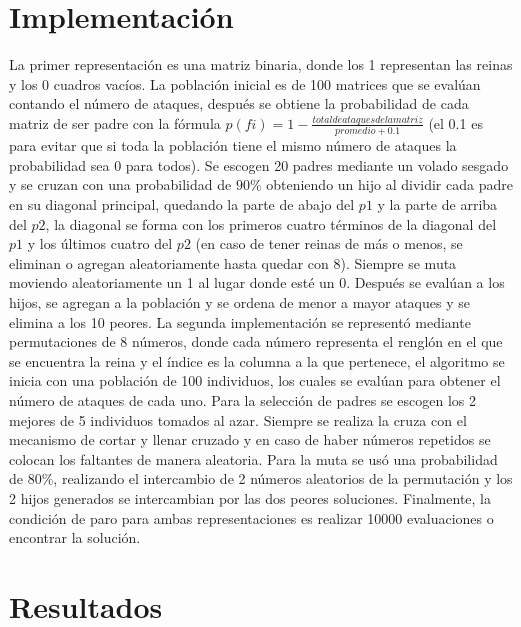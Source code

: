 \documentclass[runningheads]{llncs}
\begin{document}
\section{Implementación}
La primer representación es una matriz binaria, donde los 1 representan las reinas y los 0 cuadros vacíos. La población inicial es de 100 matrices que se evalúan contando el número de ataques, después se obtiene la probabilidad de cada matriz de ser padre con la fórmula $p(fi)=1- \frac{total de ataques de la matriz}{promedio+0.1}$ (el 0.1 es para evitar que si toda la población tiene el mismo número de ataques la probabilidad sea 0 para todos). Se escogen 20 padres mediante un volado sesgado y se cruzan con una probabilidad de $90\%$ obteniendo un hijo al dividir cada padre en su diagonal principal, quedando la parte de abajo del $p1$ y la parte de arriba del $p2$, la diagonal se forma con los primeros cuatro términos de la diagonal del $p1$ y los últimos cuatro del $p2$ (en caso de tener reinas de más o menos, se eliminan o agregan aleatoriamente hasta quedar con 8). Siempre se muta moviendo aleatoriamente un 1 al lugar donde esté un 0. Después se evalúan a los hijos, se agregan a la población y se ordena de menor a mayor ataques y se elimina a los 10 peores. La segunda implementación se representó mediante permutaciones de 8 números, donde cada número representa el renglón en el que se encuentra la reina y el índice es la columna a la que pertenece, el algoritmo se inicia con una población de 100 individuos, los cuales se evalúan para obtener el número de ataques de cada uno. Para la selección de padres se escogen los 2 mejores de 5 individuos tomados al azar. Siempre se realiza la cruza con el mecanismo de cortar y llenar cruzado y en caso de haber números repetidos se colocan los faltantes de manera aleatoria. Para la muta se usó una probabilidad de $80\%$, realizando el intercambio de 2 números aleatorios de la permutación y los 2 hijos generados se intercambian por las dos peores soluciones. Finalmente, la condición de paro para ambas representaciones es realizar 10000 evaluaciones o encontrar la solución.

\section{Resultados}
\end{document}
